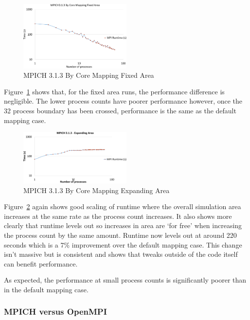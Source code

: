 \begin{figure}
    \includegraphics[page=1,width=0.5\textwidth]
    {graphs/MPICH313-by-core-mapping-fixed-area-crop.pdf}
    \caption{MPICH 3.1.3 By Core Mapping Fixed Area}
    \label{fig:mpichbycoremappingfixedarea}
\end{figure}

Figure~\ref{fig:mpichbycoremappingfixedarea} shows that, for the fixed area
runs, the performance difference is negligible. The lower process counts have
poorer performance however, once the 32 process boundary has been crossed,
performance is the same as the default mapping case.

\begin{figure}
    \includegraphics[page=1,width=0.5\textwidth]
    {graphs/MPICH313-by-core-mapping-expanding-area-crop.pdf}
    \caption{MPICH 3.1.3 By Core Mapping Expanding Area}
    \label{fig:mpichbycoremappingexpandingarea}
\end{figure}

Figure~\ref{fig:mpichbycoremappingexpandingarea} again shows good scaling of
runtime where the overall simulation area increases at the same rate as the
process count increases. It also shows more clearly that runtime levels out so
increases in area are `for free' when increasing the process count by the same
amount. Runtime now levels out at around 220 seconds which is a 7\% improvement
over the default mapping case. This change isn't massive but is consistent and
shows that tweaks outside of the code itself can benefit performance.

As expected, the performance at small process counts is significantly poorer
than in the default mapping case.

\subsubsection{MPICH versus OpenMPI}

